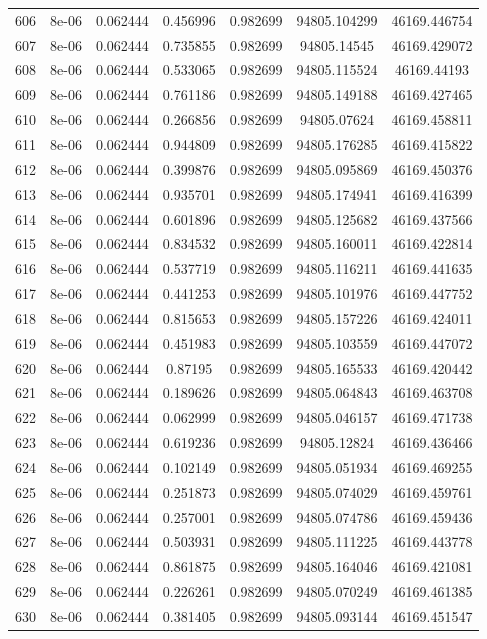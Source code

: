 \begin{table}
\begin{tabular*}{\linewidth}{c|c|c|c|c|c|c}
606 & 8e-06 & 0.062444 & 0.456996 & 0.982699 & 94805.104299 & 46169.446754\\
607 & 8e-06 & 0.062444 & 0.735855 & 0.982699 & 94805.14545 & 46169.429072\\
608 & 8e-06 & 0.062444 & 0.533065 & 0.982699 & 94805.115524 & 46169.44193\\
609 & 8e-06 & 0.062444 & 0.761186 & 0.982699 & 94805.149188 & 46169.427465\\
610 & 8e-06 & 0.062444 & 0.266856 & 0.982699 & 94805.07624 & 46169.458811\\
611 & 8e-06 & 0.062444 & 0.944809 & 0.982699 & 94805.176285 & 46169.415822\\
612 & 8e-06 & 0.062444 & 0.399876 & 0.982699 & 94805.095869 & 46169.450376\\
613 & 8e-06 & 0.062444 & 0.935701 & 0.982699 & 94805.174941 & 46169.416399\\
614 & 8e-06 & 0.062444 & 0.601896 & 0.982699 & 94805.125682 & 46169.437566\\
615 & 8e-06 & 0.062444 & 0.834532 & 0.982699 & 94805.160011 & 46169.422814\\
616 & 8e-06 & 0.062444 & 0.537719 & 0.982699 & 94805.116211 & 46169.441635\\
617 & 8e-06 & 0.062444 & 0.441253 & 0.982699 & 94805.101976 & 46169.447752\\
618 & 8e-06 & 0.062444 & 0.815653 & 0.982699 & 94805.157226 & 46169.424011\\
619 & 8e-06 & 0.062444 & 0.451983 & 0.982699 & 94805.103559 & 46169.447072\\
620 & 8e-06 & 0.062444 & 0.87195 & 0.982699 & 94805.165533 & 46169.420442\\
621 & 8e-06 & 0.062444 & 0.189626 & 0.982699 & 94805.064843 & 46169.463708\\
622 & 8e-06 & 0.062444 & 0.062999 & 0.982699 & 94805.046157 & 46169.471738\\
623 & 8e-06 & 0.062444 & 0.619236 & 0.982699 & 94805.12824 & 46169.436466\\
624 & 8e-06 & 0.062444 & 0.102149 & 0.982699 & 94805.051934 & 46169.469255\\
625 & 8e-06 & 0.062444 & 0.251873 & 0.982699 & 94805.074029 & 46169.459761\\
626 & 8e-06 & 0.062444 & 0.257001 & 0.982699 & 94805.074786 & 46169.459436\\
627 & 8e-06 & 0.062444 & 0.503931 & 0.982699 & 94805.111225 & 46169.443778\\
628 & 8e-06 & 0.062444 & 0.861875 & 0.982699 & 94805.164046 & 46169.421081\\
629 & 8e-06 & 0.062444 & 0.226261 & 0.982699 & 94805.070249 & 46169.461385\\
630 & 8e-06 & 0.062444 & 0.381405 & 0.982699 & 94805.093144 & 46169.451547\\
\end{tabular*}
\end{table}
